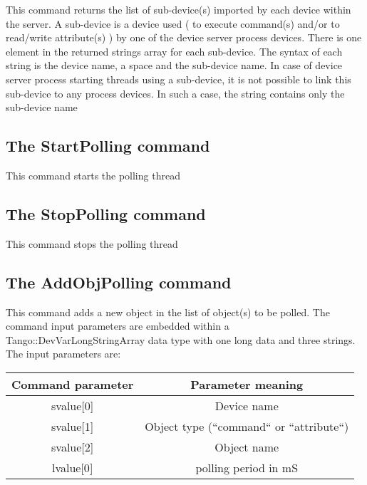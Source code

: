 This command returns the list of sub-device(s) imported by each device
within the server. A sub-device is a device used ( to execute command(s)
and/or to read/write attribute(s) ) by one of the device server process
devices. There is one element in the returned strings array for each
sub-device. The syntax of each string is the device name, a space
and the sub-device name. In case of device server process starting
threads using a sub-device, it is not possible to link this sub-device
to any process devices. In such a case, the string contains only the
sub-device name

\subsection{The StartPolling command}

This command starts the polling thread

\subsection{The StopPolling command}

This command stops the polling thread

\subsection{The AddObjPolling command}

This command adds a new object in the list of object(s) to be polled.
The command input parameters are embedded within a Tango::DevVarLongStringArray
data type with one long data and three strings. The input parameters
are:

\vspace{0.3cm}

\begin{center}
\begin{longtable}{|c|c|}
\hline 
Command parameter & Parameter meaning\tabularnewline
\hline 
\hline 
svalue{[}0{]} & Device name\tabularnewline
\hline 
svalue{[}1{]} & Object type (``command`` or ``attribute``)\tabularnewline
\hline 
svalue{[}2{]} & Object name\tabularnewline
\hline 
lvalue{[}0{]} & polling period in mS\tabularnewline
\hline 
\end{longtable}
\par\end{center}

\vspace{0.3cm}


